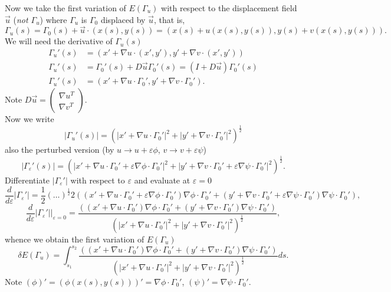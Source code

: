\documentclass[10pt,a4paper]{article}
\begin{document}
Now we take the first variation of $E(\Gamma_u)$ with 
respect to the displacement field $\vec{u}$ (\emph{not $\Gamma_u$})
where $\Gamma_u$ is $\Gamma_0$ displaced by $\vec{u}$, that is,
\[
\Gamma_u(s) = \Gamma_0(s) + \vec{u}\cdot (x(s),y(s)) = \left( x(s)+u(x(s),y(s)), y(s)+v(x(s),y(s)) \right).
\]
We will need the derivative of $\Gamma_u(s)$
%
\begin{align*}
\Gamma_u'(s) &= \left( x' + \nabla u \cdot (x',y'), y' + \nabla v \cdot (x',y') \right) \\
\Gamma_u'(s) &= \Gamma_0'(s) + D\vec{u} \Gamma_0'(s) = (I + D\vec{u}) \Gamma_0'(s) \\
\Gamma_u'(s) &= \left( x' + \nabla u \cdot \Gamma_0', y' + \nabla v \cdot \Gamma_0' \right) .
\end{align*}
%
Note $D\vec{u} = \left( \begin{array}{c} \nabla u^T \\ \nabla v^T \end{array} \right)$. \\
Now we write
\[
|\Gamma_u'(s)| = \left( |x' + \nabla u \cdot \Gamma_0'|^2 + |y' + \nabla v \cdot \Gamma_0'|^2  \right)^\frac{1}{2}
\]
also the perturbed version (by $u \rightarrow u+\varepsilon\phi$, $v \rightarrow v+\varepsilon\psi$)
\[
|\Gamma_\varepsilon'(s)| = \left( |x' + \nabla u \cdot \Gamma_0'+ \varepsilon\nabla\phi \cdot \Gamma_0'|^2 + |y' + \nabla v \cdot \Gamma_0'+ \varepsilon\nabla\psi \cdot \Gamma_0'|^2  \right)^\frac{1}{2}.
\]
Differentiate $|\Gamma_\varepsilon'|$ with respect to $\varepsilon$ and evaluate at $\varepsilon=0$
%
\begin{equation*}
\frac{d}{d\varepsilon}|\Gamma_\varepsilon'| 
= \frac{1}{2}\left( \ldots \right)^\frac{1}{2}
2 \left( (x' + \nabla u \cdot \Gamma_0'+ \varepsilon\nabla\phi \cdot \Gamma_0')\nabla\phi\cdot\Gamma_0' +
(y' + \nabla v \cdot \Gamma_0'+ \varepsilon\nabla\psi \cdot \Gamma_0')\nabla\psi\cdot\Gamma_0' \right),
\end{equation*}
%
\begin{equation*}
\frac{d}{d\varepsilon}|\Gamma_\varepsilon'| |_{\varepsilon=0} =
\frac{ \left( (x' + \nabla u \cdot \Gamma_0')\nabla\phi\cdot\Gamma_0' +
(y' + \nabla v \cdot \Gamma_0')\nabla\psi\cdot\Gamma_0' \right) }
{\left( |x' + \nabla u \cdot \Gamma_0'|^2 + |y' + \nabla v \cdot \Gamma_0'|^2  \right)^\frac{1}{2}},
\end{equation*}
%
whence we obtain the first variation of $E(\Gamma_u)$
%
\begin{equation}\label{E:displaced_curve_1st_variation}
\delta E(\Gamma_u) = \int_{s_1}^{s_2}
\frac{ \left( (x' + \nabla u \cdot \Gamma_0')\nabla\phi\cdot\Gamma_0' +
(y' + \nabla v \cdot \Gamma_0')\nabla\psi\cdot\Gamma_0' \right) }
{\left( |x' + \nabla u \cdot \Gamma_0'|^2 + |y' + \nabla v \cdot \Gamma_0'|^2  \right)^\frac{1}{2}} ds.
\end{equation}
%
Note $(\phi)' = (\phi(x(s),y(s)))'=\nabla\phi\cdot\Gamma_0'$, $(\psi)'=\nabla\psi\cdot\Gamma_0'$. 
\end{document}
